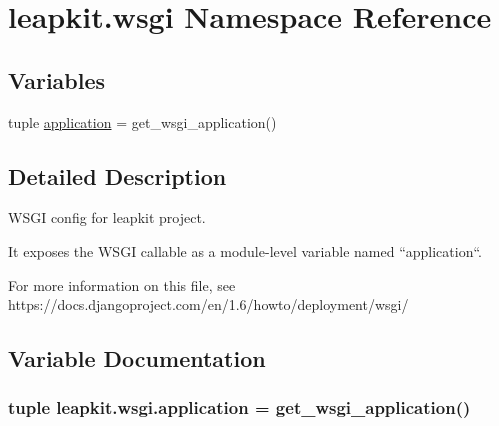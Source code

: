 \hypertarget{namespaceleapkit_1_1wsgi}{\section{leapkit.\-wsgi Namespace Reference}
\label{namespaceleapkit_1_1wsgi}
}
\subsection*{Variables}
\begin{DoxyCompactItemize}
\item 
tuple \hyperlink{namespaceleapkit_1_1wsgi_ae42478854b5ec7a5151d43ea86f16515}{application} = get\-\_\-wsgi\-\_\-application()
\end{DoxyCompactItemize}


\subsection{Detailed Description}
\begin{DoxyVerb}WSGI config for leapkit project.

It exposes the WSGI callable as a module-level variable named ``application``.

For more information on this file, see
https://docs.djangoproject.com/en/1.6/howto/deployment/wsgi/
\end{DoxyVerb}
 

\subsection{Variable Documentation}
\hypertarget{namespaceleapkit_1_1wsgi_ae42478854b5ec7a5151d43ea86f16515}{
\subsubsection[{application}]{\setlength{\rightskip}{0pt plus 5cm}tuple leapkit.\-wsgi.\-application = get\-\_\-wsgi\-\_\-application()}}\label{namespaceleapkit_1_1wsgi_ae42478854b5ec7a5151d43ea86f16515}
